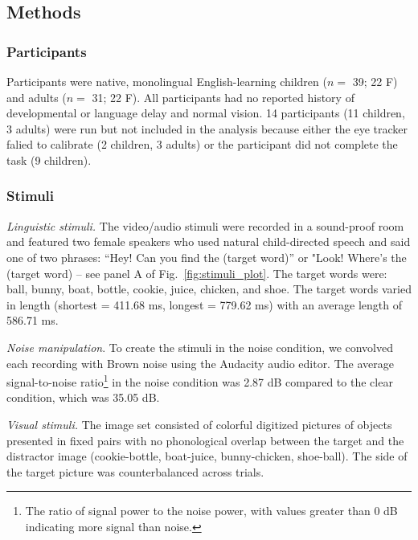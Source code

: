 \documentclass[english,floatsintext,man]{apa6}
\begin{document}
\hypertarget{methods-2}{%
\subsection{Methods}\label{methods-2}}

\hypertarget{participants-2}{%
\subsubsection{Participants}\label{participants-2}}

Participants were native, monolingual English-learning children (\(n=\)
39; 22 F) and adults (\(n=\) 31; 22 F). All participants had no reported
history of developmental or language delay and normal vision. 14
participants (11 children, 3 adults) were run but not included in the
analysis because either the eye tracker falied to calibrate (2 children,
3 adults) or the participant did not complete the task (9 children).

\hypertarget{stimuli-2}{%
\subsubsection{Stimuli}\label{stimuli-2}}

\emph{Linguistic stimuli.} The video/audio stimuli were recorded in a
sound-proof room and featured two female speakers who used natural
child-directed speech and said one of two phrases: \enquote{Hey! Can you
find the (target word)} or "Look! Where's the (target word) -- see panel
A of Fig.~\ref{fig:stimuli_plot}. The target words were: ball, bunny,
boat, bottle, cookie, juice, chicken, and shoe. The target words varied
in length (shortest = 411.68 ms, longest = 779.62 ms) with an average
length of 586.71 ms.

\emph{Noise manipulation}. To create the stimuli in the noise condition,
we convolved each recording with Brown noise using the Audacity audio
editor. The average signal-to-noise ratio\footnote{The ratio of signal
  power to the noise power, with values greater than 0 dB indicating
  more signal than noise.} in the noise condition was 2.87 dB compared
to the clear condition, which was 35.05 dB.

\emph{Visual stimuli.} The image set consisted of colorful digitized
pictures of objects presented in fixed pairs with no phonological
overlap between the target and the distractor image (cookie-bottle,
boat-juice, bunny-chicken, shoe-ball). The side of the target picture
was counterbalanced across trials.
\end{document}
